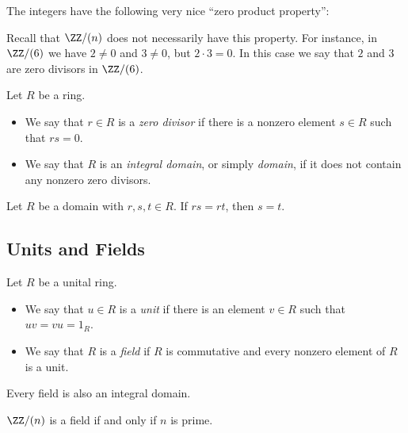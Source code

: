 \documentclass{article}
\begin{document}

The integers have the following very nice ``zero product property'':

\begin{center}
\end{center}

Recall that $\ZZ/(n)$ does not necessarily have this property. For instance, in $\ZZ/(6)$ we have $2 \neq 0$ and $3 \neq 0$, but $2 \cdot 3 = 0$. In this case we say that $2$ and $3$ are zero divisors in $\ZZ/(6)$.

\begin{dfn}
Let $R$ be a ring.
\begin{itemize}
\item We say that $r \in R$ is a \emph{zero divisor} if there is a nonzero element $s \in R$ such that $rs = 0$.
\item We say that $R$ is an \emph{integral domain}, or simply \emph{domain}, if it does not contain any nonzero zero divisors.
\end{itemize}
\end{dfn}

\begin{prop}[Cancellation]
Let $R$ be a domain with $r,s,t \in R$. If $rs = rt$, then $s = t$.
\end{prop}

\subsection*{Units and Fields}

\begin{dfn}[Unit]
Let $R$ be a unital ring.
\begin{itemize}
\item We say that $u \in R$ is a \emph{unit} if there is an element $v \in R$ such that $uv = vu = 1_R$.
\item We say that $R$ is a \emph{field} if $R$ is commutative and every nonzero element of $R$ is a unit.
\end{itemize}
\end{dfn}

\begin{prop}
Every field is also an integral domain.
\end{prop}

\begin{prop}
$\ZZ/(n)$ is a field if and only if $n$ is prime.
\end{prop}
\end{document}
